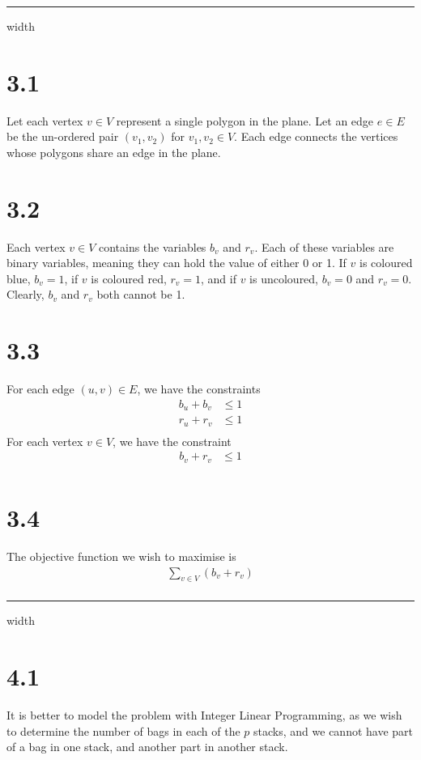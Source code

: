 \documentclass[a4paper,11pt]{article}
\newcommand{\ds}{\displaystyle}
\begin{document}
\vspace{2mm}
\hrule width \hsize \kern 1mm

\section{3.1}
Let each vertex $\ds{v \in V}$ represent a single polygon in the plane. Let an edge $\ds{e \in E}$ be the un-ordered pair $\ds{(v_1,v_2)}$ for $\ds{v_1,v_2 \in V}$. Each edge connects the vertices whose polygons share an edge in the plane.

\section{3.2}
Each vertex $\ds{v \in V}$ contains the variables $\ds{b_v}$ and $\ds{r_v}$. Each of these variables are binary variables, meaning they can hold the value of either 0 or 1. If $\ds{v}$ is coloured blue, $\ds{b_v = 1}$, if $\ds{v}$ is coloured red, $\ds{r_v = 1}$, and if $\ds{v}$ is uncoloured, $\ds{b_v = 0}$ and $\ds{r_v = 0}$. Clearly, $\ds{b_v}$ and $\ds{r_v}$ both cannot be 1.

\section{3.3}
For each edge $\ds{(u,v) \in E}$, we have the constraints
\begin{align*}
	b_u + b_v & \leq 1\\
	r_u + r_v & \leq 1\\
\end{align*}
For each vertex $\ds{v \in V}$, we have the constraint
\begin{align*}
	b_v + r_v & \leq 1\\
\end{align*}

\section{3.4}
The objective function we wish to maximise is 
\begin{align*}
	\sum_{v \in V} (b_v + r_v)\\
\end{align*}

\vspace{2mm}
\hrule width \hsize \kern 1mm
\vspace{2mm}

\section{4.1}
It is better to model the problem with Integer Linear Programming, as we wish to determine the number of bags in each of the $\ds{p}$ stacks, and we cannot have part of a bag in one stack, and another part in another stack.
\end{document}
